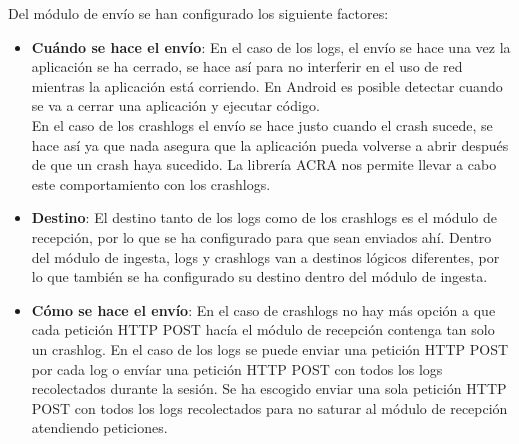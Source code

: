 Del módulo de envío se han configurado los siguiente factores:

\begin{itemize}
	\item \textbf{Cuándo se hace el envío}: En el caso de los logs, el envío se hace una vez la aplicación se ha cerrado, se hace así para no interferir en el uso de red mientras la aplicación está corriendo. En Android es posible detectar cuando se va a cerrar una aplicación y ejecutar código. \\ En el caso de los crashlogs el envío se hace justo cuando el crash sucede, se hace así ya que nada asegura que la aplicación pueda volverse a abrir después de que un crash haya sucedido. La librería ACRA nos permite llevar a cabo este comportamiento con los crashlogs.
	
	\item \textbf{Destino}: El destino tanto de los logs como de los crashlogs es el módulo de recepción, por lo que se ha configurado para que sean enviados ahí. Dentro del módulo de ingesta, logs y crashlogs van a destinos lógicos diferentes, por lo que también se ha configurado su destino dentro del módulo de ingesta.
	
	\item \textbf{Cómo se hace el envío}: En el caso de crashlogs no hay más opción a que cada petición HTTP POST hacía el módulo de recepción contenga tan solo un crashlog. En el caso de los logs se puede enviar una petición HTTP POST por cada log o envíar una petición HTTP POST con todos los logs recolectados durante la sesión. Se ha escogido enviar una sola petición HTTP POST con todos los logs recolectados para no saturar al módulo de recepción atendiendo peticiones.
\end{itemize}


















